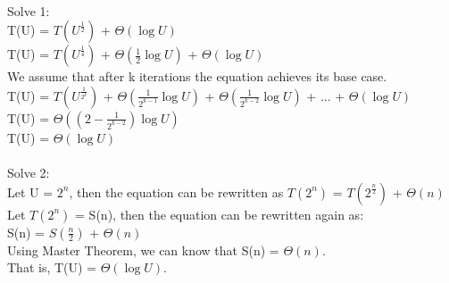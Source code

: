 \begin{problem}{4} ~\\
Solve 1:\\
\tab T(U) = $T({U}^{\frac{1}{2}})$ + $\Theta(\log{U})$\\
\tab T(U) = $T({U}^{\frac{1}{4}})$ + $\Theta(\frac{1}{2}\log{U})$ + $\Theta(\log{U})$\\
\tab We assume that after k iterations the equation achieves its base case.\\
\tab T(U) = $T({U}^{\frac{1}{2^k}})$ + $\Theta(\frac{1}{2^{k-1}}\log{U})$ + $\Theta(\frac{1}{2^{k-2}}\log{U})$ + ... + $\Theta(\log{U})$\\
\tab T(U) = $\Theta((2-\frac{1}{2^{k-2}}) \log{U})$\\
\tab T(U) = $\Theta(\log{U})$\\
\\
Solve 2:\\
\tab Let U = ${2}^{n}$, then the equation can be rewritten as $T(2^n)$ = $T({2}^{\frac{n}{2}})$ + $\Theta(n)$\\ 
\tab Let $T(2^n)$ = S(n), then the equation can be rewritten again as:\\
\tab S(n) = $S(\frac{n}{2})$ + $\Theta(n)$\\
\tab Using Master Theorem, we can know that S(n) = $\Theta(n)$.\\
\tab That is, T(U) = $\Theta(\log {U})$.\\
\end{problem}